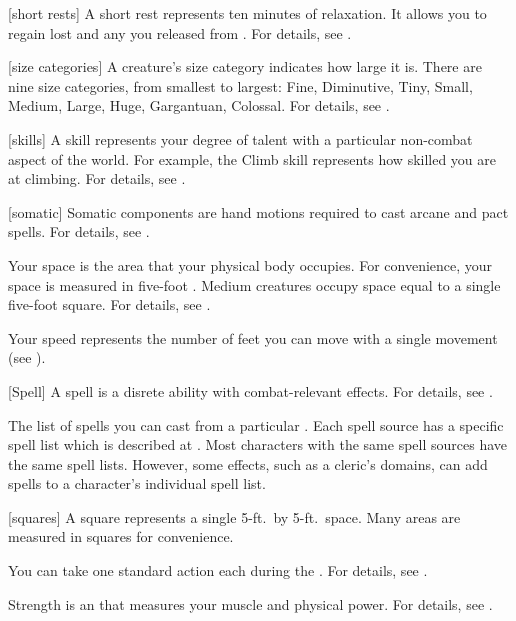 [short rests] A short rest represents ten minutes of relaxation.
It allows you to regain lost  and any  you released from .
For details, see .

[size categories] A creature's size category indicates how large it is.
There are nine size categories, from smallest to largest: Fine, Diminutive, Tiny, Small, Medium, Large, Huge, Gargantuan, Colossal.
For details, see .

[skills] A skill represents your degree of talent with a particular non-combat aspect of the world.
For example, the Climb skill represents how skilled you are at climbing.
For details, see .

[somatic] Somatic components are hand motions required to cast arcane and pact spells.
For details, see .

 Your space is the area that your physical body occupies.
For convenience, your space is measured in five-foot .
Medium creatures occupy space equal to a single five-foot square.
For details, see .

 Your speed represents the number of feet you can move with a single movement (see ).

[Spell] A spell is a disrete \magical ability with combat-relevant effects.
For details, see .

 The list of spells you can cast from a particular .
Each spell source has a specific spell list which is described at .
Most characters with the same spell sources have the same spell lists.
However, some effects, such as a cleric's domains, can add spells to a character's individual spell list.

[squares] A square represents a single 5-ft.\ by 5-ft.\ space.
Many areas are measured in squares for convenience.

 You can take one standard action each  during the .
For details, see .

 Strength is an  that measures your muscle and physical power.
For details, see .

